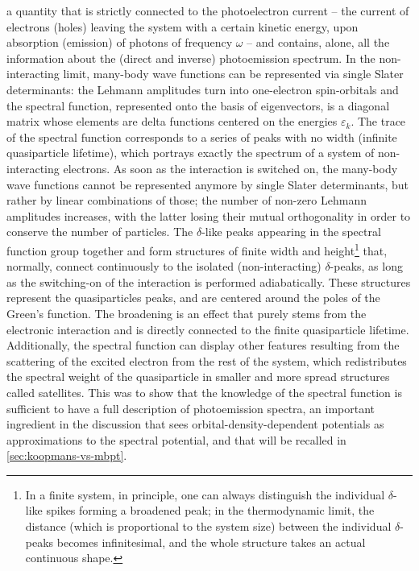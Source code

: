 a quantity that is strictly connected to the photoelectron current -- the current of electrons (holes) leaving the system with a certain kinetic energy, upon absorption (emission) of photons of frequency $\omega$ -- and contains, alone, all the information about the (direct and inverse) photoemission spectrum. In the non-interacting limit, many-body wave functions can be represented via single Slater determinants: the Lehmann amplitudes turn into one-electron spin-orbitals and the spectral function, represented onto the basis of eigenvectors, is a diagonal matrix whose elements are delta functions centered on the energies $\varepsilon_k$. The trace of the spectral function corresponds to a series of peaks with no width (infinite quasiparticle lifetime), which portrays exactly the spectrum of a system of non-interacting electrons. As soon as the interaction is switched on, the many-body wave functions cannot be represented anymore by single Slater determinants, but rather by linear combinations of those; the number of non-zero Lehmann amplitudes increases, with the latter losing their mutual orthogonality in order to conserve the number of particles. The $\delta$-like peaks appearing in the spectral function group together and form structures of finite width and height\footnote{In a finite system, in principle, one can always distinguish the individual $\delta$-like spikes forming a broadened peak; in the thermodynamic limit, the distance (which is proportional to the system size) between the individual $\delta$-peaks becomes infinitesimal, and the whole structure takes an actual continuous shape.} that, normally, connect continuously to the isolated (non-interacting) $\delta$-peaks, as long as the switching-on of the interaction is performed adiabatically. These structures represent the quasiparticles peaks, and are centered around the poles of the Green's function. The broadening is an effect that purely stems from the electronic interaction and is directly connected to the finite quasiparticle lifetime. Additionally, the spectral function can display other features resulting from the scattering of the excited electron from the rest of the system, which redistributes the spectral weight of the quasiparticle in smaller and more spread structures called satellites. This was to show that the knowledge of the spectral function is sufficient to have a full description of photoemission spectra, an important ingredient in the discussion that sees orbital-density-dependent potentials as approximations to the spectral potential, and that will be recalled in \cref{sec:koopmans-vs-mbpt}.

